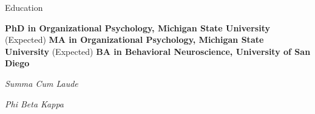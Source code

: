 \begin{rubric}{Education}

\entry*[2021]%
	\textbf{PhD in Organizational Psychology, Michigan State University} (Expected)
%
\entry*[2019]%
	\textbf{MA in Organizational Psychology, Michigan State University} (Expected)
%
%
\entry*[2016]%
	\textbf{BA in Behavioral Neuroscience, University of San Diego}\par
	\emph{Summa Cum Laude}\par
	\emph{Phi Beta Kappa}
%
\end{rubric}

